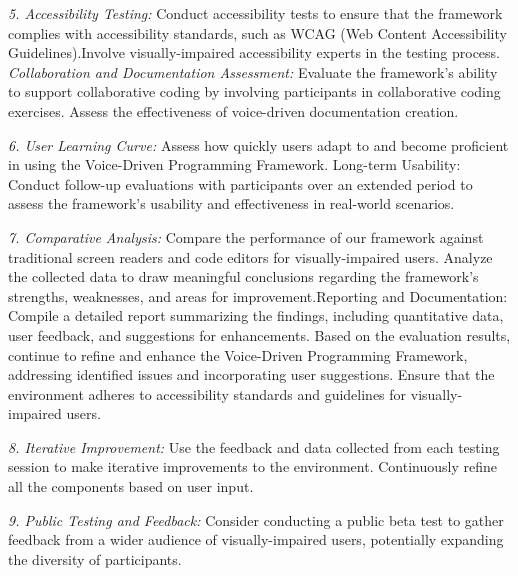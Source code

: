 {\em 5. Accessibility Testing:} Conduct accessibility tests to ensure
that the framework complies with accessibility standards, such as WCAG
(Web Content Accessibility Guidelines).Involve visually-impaired
accessibility experts in the testing process. {\em Collaboration and
  Documentation Assessment:} Evaluate the framework's ability to
support collaborative coding by involving participants in
collaborative coding exercises.  Assess the effectiveness of
voice-driven documentation creation.

{\em 6. User Learning Curve:} Assess how quickly users adapt to and
become proficient in using the Voice-Driven Programming
Framework. Long-term Usability: Conduct follow-up evaluations with
participants over an extended period to assess the framework's
usability and effectiveness in real-world scenarios.

{\em 7. Comparative Analysis:} Compare the performance of our
framework against traditional screen readers and code editors for
visually-impaired users. Analyze the collected data to draw meaningful
conclusions regarding the framework's strengths, weaknesses, and areas
for improvement.Reporting and Documentation: Compile a detailed report
summarizing the findings, including quantitative data, user feedback,
and suggestions for enhancements. Based on the evaluation results,
continue to refine and enhance the Voice-Driven Programming Framework,
addressing identified issues and incorporating user suggestions.
Ensure that the environment adheres to accessibility standards and
guidelines for visually-impaired users.

{\em 8. Iterative Improvement:} Use the feedback and data collected
from each testing session to make iterative improvements to the
environment.  Continuously refine all the components
based on user input.

{\em 9. Public Testing and Feedback:} Consider conducting a public
beta test to gather feedback from a wider audience of
visually-impaired users, potentially expanding the diversity of
participants.




